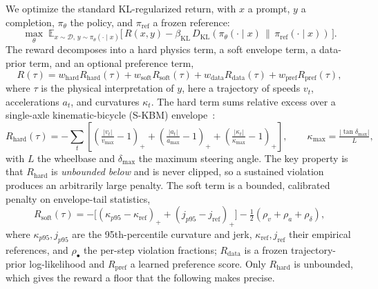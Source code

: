 \documentclass{article}
\newcommand{\E}{\mathbb{E}}
\newcommand{\kl}[2]{D_{\mathrm{KL}}\!\left(#1 \,\|\, #2\right)}
\newcommand{\relu}[1]{\left(#1\right)_{\!+}}
\newcommand{\Rhard}{R_{\mathrm{hard}}}
\newcommand{\pref}{\pi_{\mathrm{ref}}}
\begin{document}
We optimize the standard KL-regularized return, with $x$ a prompt, $y$ a completion, $\pi_\theta$ the policy, and $\pref$ a frozen reference:
\begin{equation}
\max_\theta\; \E_{x\sim\mathcal{D},\, y\sim\pi_\theta(\cdot\mid x)}\big[\, R(x,y) - \beta_{\mathrm{KL}}\,\kl{\pi_\theta(\cdot\mid x)}{\pref(\cdot\mid x)} \,\big].
\end{equation}
The reward decomposes into a hard physics term, a soft envelope term, a data-prior term, and an optional preference term,
\begin{equation}
R(\tau) = w_{\mathrm{hard}} \Rhard(\tau) + w_{\mathrm{soft}} R_{\mathrm{soft}}(\tau) + w_{\mathrm{data}} R_{\mathrm{data}}(\tau) + w_{\mathrm{pref}} R_{\mathrm{pref}}(\tau),
\label{eq:reward}
\end{equation}
where $\tau$ is the physical interpretation of $y$, here a trajectory of speeds $v_t$, accelerations $a_t$, and curvatures $\kappa_t$. The hard term sums relative excess over a single-axle kinematic-bicycle (S-KBM) envelope~\cite{kong2015}:
\begin{equation}
\Rhard(\tau) = -\sum_t \left[ \relu{\tfrac{|v_t|}{v_{\max}} - 1} + \relu{\tfrac{|a_t|}{a_{\max}} - 1} + \relu{\tfrac{|\kappa_t|}{\kappa_{\max}} - 1} \right], \qquad \kappa_{\max} = \tfrac{|\tan\delta_{\max}|}{L},
\label{eq:hard}
\end{equation}
with $L$ the wheelbase and $\delta_{\max}$ the maximum steering angle. The key property is that $\Rhard$ is \emph{unbounded below} and is never clipped, so a sustained violation produces an arbitrarily large penalty. The soft term is a bounded, calibrated penalty on envelope-tail statistics,
\begin{equation}
R_{\mathrm{soft}}(\tau) = -\big[(\kappa_{p95}-\kappa_{\mathrm{ref}})_{+} + (j_{p95}-j_{\mathrm{ref}})_{+}\big] - \tfrac{1}{2}(\rho_v + \rho_a + \rho_\delta),
\label{eq:soft}
\end{equation}
where $\kappa_{p95}, j_{p95}$ are the 95th-percentile curvature and jerk, $\kappa_{\mathrm{ref}}, j_{\mathrm{ref}}$ their empirical references, and $\rho_\bullet$ the per-step violation fractions; $R_{\mathrm{data}}$ is a frozen trajectory-prior log-likelihood and $R_{\mathrm{pref}}$ a learned preference score. Only $\Rhard$ is unbounded, which gives the reward a floor that the following makes precise.
\end{document}
